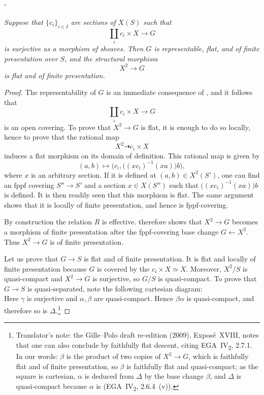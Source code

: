 \paragraph{.}
\textit{Suppose that \(\{c_i\}_{i\in I}\) are sections of
\(X(S)\) such that
\[
  \coprod_i c_i\times X\longrightarrow G
\]
is surjective as a morphism of sheaves. Then \(G\) is
representable, flat, and of finite presentation over \(S\), and
the structural morphism
\[
  X^2\longrightarrow G
\]
is flat and of finite presentation.}

\begin{proof}
The representability of \(G\) is an immediate consequence of
, and it follows that
\[
  \coprod_i c_i\times X\longrightarrow G
\]
is an open covering. To prove that \(X^2\to G\) is flat, it is
enough to do so locally, hence to prove that the rational map
\[
  X^2\dashrightarrow c_i\times X
\]
induces a flat morphism on its domain of definition. This rational
map is given by
\[
  (a,b)\longmapsto
  \bigl(c_i,\bigl((xc_i)^{-1}(xa)\bigr)b\bigr),
\]
where \(x\) is an arbitrary section. If it is defined at
\((a,b)\in X^2(S')\), one can find an fppf covering
\(S''\to S'\) and a section \(x\in X(S'')\) such that
\(\bigl((xc_i)^{-1}(xa)\bigr)b\) is defined. It is then readily
seen that this morphism is flat. The same argument shows that it
is locally of finite presentation, and hence is fppf-covering.

By construction the relation \(R\) is effective. 
therefore shows that \(X^2\to G\) becomes a morphism of finite
presentation after the fppf-covering base change
\(G\leftarrow X^2\). Thus \(X^2\to G\) is of finite presentation.

Let us prove that \(G\to S\) is flat and of finite presentation.
It is flat and locally of finite presentation because \(G\) is
covered by the \(c_i\times X\simeq X\). Moreover, \(X^2/S\) is
quasi-compact and \(X^2\to G\) is surjective, so \(G/S\) is
quasi-compact. To prove that \(G\to S\) is quasi-separated, note
the following cartesian diagram:
\[

\]
Here \(\gamma\) is surjective and \(\alpha,\beta\) are
quasi-compact. Hence \(\beta\alpha\) is quasi-compact, and
therefore so is \(\Delta\).\footnote{Translator's note: the Gille--Polo draft re-edition (2009),
Exposé~XVIII, notes that one can also conclude by faithfully flat descent, citing
EGA~IV\textsubscript{2}, 2.7.1. In our words: \(\beta\) is the product of two copies of \(X^2\to G\),
which is faithfully flat and of finite presentation, so \(\beta\) is faithfully flat and quasi-compact; as
the square is cartesian, \(\alpha\) is deduced from \(\Delta\) by the base change \(\beta\), and \(\Delta\)
is quasi-compact because \(\alpha\) is (EGA~IV\textsubscript{2}, 2.6.4~(v)).}
\end{proof}

